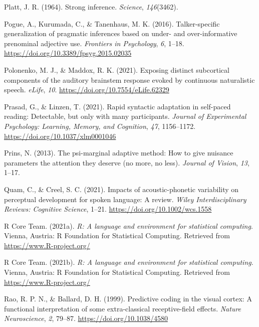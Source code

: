 \documentclass[
  11pt,
  english,
  man,floatsintext]{apa6}
\newlength{\cslhangindent}
\newlength{\cslentryspacingunit} %
\newenvironment{CSLReferences}[2] %
 {%
  \setlength{\parindent}{0pt}
  \ifodd #1
  \let\oldpar\par
  \def\par{\hangindent=\cslhangindent\oldpar}
  \fi
  \setlength{\parskip}{#2\cslentryspacingunit}
 }%
 {}
\begin{document}
\begin{CSLReferences}{1}{0}
\leavevmode{}%
Platt, J. R. (1964). Strong inference. \emph{Science}, \emph{146}(3462).

\leavevmode{}%
Pogue, A., Kurumada, C., \& Tanenhaus, M. K. (2016). Talker-specific generalization of pragmatic inferences based on under- and over-informative prenominal adjective use. \emph{Frontiers in Psychology}, \emph{6}, 1--18. \url{https://doi.org/10.3389/fpsyg.2015.02035}

\leavevmode{}%
Polonenko, M. J., \& Maddox, R. K. (2021). Exposing distinct subcortical components of the auditory brainstem response evoked by continuous naturalistic speech. \emph{eLife}, \emph{10}. \url{https://doi.org/10.7554/eLife.62329}

\leavevmode{}%
Prasad, G., \& Linzen, T. (2021). Rapid syntactic adaptation in self-paced reading: Detectable, but only with many participants. \emph{Journal of Experimental Psychology: Learning, Memory, and Cognition}, \emph{47}, 1156--1172. \url{https://doi.org/10.1037/xlm0001046}

\leavevmode{}%
Prins, N. (2013). The psi-marginal adaptive method: How to give nuisance parameters the attention they deserve (no more, no less). \emph{Journal of Vision}, \emph{13}, 1--17.

\leavevmode{}%
Quam, C., \& Creel, S. C. (2021). Impacts of acoustic-phonetic variability on perceptual development for spoken language: A review. \emph{Wiley Interdisciplinary Reviews: Cognitive Science}, 1--21. \url{https://doi.org/10.1002/wcs.1558}

\leavevmode{}%
R Core Team. (2021a). \emph{R: A language and environment for statistical computing}. Vienna, Austria: R Foundation for Statistical Computing. Retrieved from \url{https://www.R-project.org/}

\leavevmode{}%
R Core Team. (2021b). \emph{R: A language and environment for statistical computing}. Vienna, Austria: R Foundation for Statistical Computing. Retrieved from \url{https://www.R-project.org/}

\leavevmode{}%
Rao, R. P. N., \& Ballard, D. H. (1999). Predictive coding in the visual cortex: A functional interpretation of some extra-classical receptive-field effects. \emph{Nature Neuroscience}, \emph{2}, 79--87. \url{https://doi.org/10.1038/4580}


\end{CSLReferences}
\end{document}

